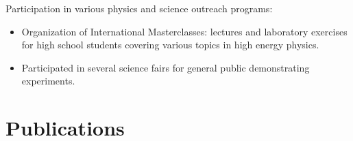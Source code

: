 \documentclass[letterpaper,12pt]{article}
\begin{document}
Participation in various physics and science outreach programs:
\begin{itemize}
	\item Organization of International Masterclasses: lectures and laboratory exercises for high school students covering various topics in high energy physics.
	\item Participated in several science fairs for general public demonstrating experiments. 
\end{itemize}


\section*{Publications}
\end{document}
